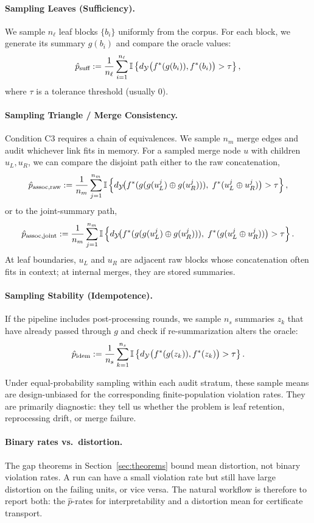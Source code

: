 \paragraph{Sampling Leaves (Sufficiency).}
We sample $n_\ell$ leaf blocks $\{b_i\}$ uniformly from the corpus. For each block, we generate its summary $g(b_i)$ and compare the oracle values:
\[
\hat{p}_{\text{suff}} := \frac{1}{n_\ell} \sum_{i=1}^{n_\ell} \mathbb{I}\left\{ d_{\mathcal{Y}}\big(f^\ast(g(b_i)), f^\ast(b_i)\big) > \tau \right\},
\]
where $\tau$ is a tolerance threshold (usually 0).

\paragraph{Sampling Triangle / Merge Consistency.}
Condition C3 requires a chain of equivalences. We sample $n_m$ merge edges and audit whichever link fits in memory. For a sampled merge node $u$ with children $u_L, u_R$, we can compare the disjoint path either to the raw concatenation,
\[
\hat{p}_{\text{assoc,raw}} := \frac{1}{n_m} \sum_{j=1}^{n_m} \mathbb{I}\left\{ d_{\mathcal{Y}}\!\big(f^\ast(g(g(u_L^j) \oplus g(u_R^j))),\; f^\ast(u_L^j \oplus u_R^j)\big) > \tau \right\},
\]
or to the joint-summary path,
\[
\hat{p}_{\text{assoc,joint}} := \frac{1}{n_m} \sum_{j=1}^{n_m} \mathbb{I}\left\{ d_{\mathcal{Y}}\!\big(f^\ast(g(g(u_L^j) \oplus g(u_R^j))),\; f^\ast(g(u_L^j \oplus u_R^j))\big) > \tau \right\}.
\]
At leaf boundaries, $u_L$ and $u_R$ are adjacent raw blocks whose concatenation often fits in context; at internal merges, they are stored summaries.

\paragraph{Sampling Stability (Idempotence).}
If the pipeline includes post-processing rounds, we sample $n_s$ summaries $z_k$ that have already passed through $g$ and check if re-summarization alters the oracle:
\[
\hat{p}_{\text{idem}} := \frac{1}{n_s} \sum_{k=1}^{n_s} \mathbb{I}\left\{ d_{\mathcal{Y}}\big(f^\ast(g(z_k)), f^\ast(z_k)\big) > \tau \right\}.
\]

Under equal-probability sampling within each audit stratum, these sample means are design-unbiased for the corresponding finite-population violation rates. They are primarily diagnostic: they tell us whether the problem is leaf retention, reprocessing drift, or merge failure.

\paragraph{Binary rates vs.\ distortion.}
The gap theorems in Section~\ref{sec:theorems} bound mean distortion, not binary violation rates. A run can have a small violation rate but still have large distortion on the failing units, or vice versa. The natural workflow is therefore to report both: the $\hat{p}$-rates for interpretability and a distortion mean for certificate transport.

